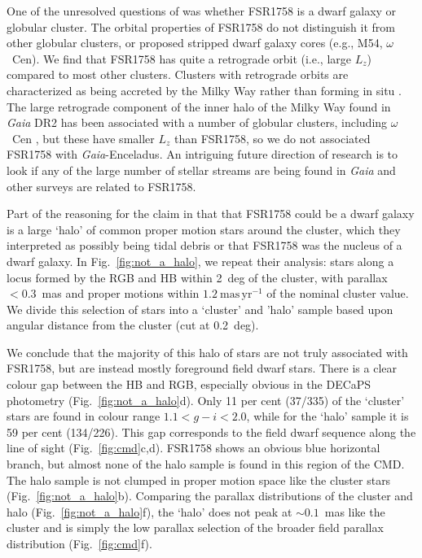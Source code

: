 \documentclass[fleqn,usenatbib,letters]{mnras}
\newcommand{\masyr}{~\ensuremath{\textrm{mas}\,\textrm{yr}^{-1}}}
\begin{document}
One of the unresolved questions of  was whether FSR1758 is a dwarf galaxy or globular cluster. The orbital properties of FSR1758 do not distinguish it from other globular clusters, or proposed stripped dwarf galaxy cores (e.g., M54, $\omega$~Cen). We find that FSR1758 has quite a retrograde orbit (i.e., large $L_z$) compared to most other clusters. Clusters with retrograde orbits are characterized as being accreted by the Milky Way rather than forming in situ \citep[e.g.,][]{Kruijssen2018}. The large retrograde component of the inner halo of the Milky Way found in \textit{Gaia} DR2 has been associated with a number of globular clusters, including $\omega$~Cen \citep{Helmi:2018wy}, but these have smaller $L_z$ than FSR1758, so we do not associated FSR1758 with \textit{Gaia}-Enceladus. An intriguing future direction of research is to look if any of the large number of stellar streams are being found in \textit{Gaia} and other surveys \citep[e.g.,][]{Shipp2018,Ibata:2018wn,Malhan:2018ko,Ibata2019} are related to FSR1758.

Part of the reasoning for the claim in  that that FSR1758 could be a dwarf galaxy is a large `halo' of common proper motion stars around the cluster, which they interpreted as possibly being tidal debris or that FSR1758 was the nucleus of a dwarf galaxy. In Fig.\ \ref{fig:not_a_halo}, we repeat their analysis: stars along a locus formed by the RGB and HB within 2~deg of the cluster, with parallax $<0.3$~mas and proper motions within $1.2\masyr$ of the nominal cluster value. We divide this selection of stars into a `cluster' and 'halo' sample based upon angular distance from the cluster (cut at 0.2~deg).

We conclude that the majority of this halo of stars are not truly associated with FSR1758, but are instead mostly foreground field dwarf stars. There is a clear colour gap between the HB and RGB, especially obvious in the DECaPS photometry (Fig.\ \ref{fig:not_a_halo}d). Only 11 per cent (37/335) of the `cluster' stars are found in colour range $1.1<g-i<2.0$,  while for the `halo' sample it is 59 per cent (134/226). This gap corresponds to the field dwarf sequence along the line of sight (Fig.\ \ref{fig:cmd}c,d). FSR1758 shows an obvious blue horizontal branch, but almost none of the halo sample is found in this region of the CMD. The halo sample is not clumped in proper motion space like the cluster stars (Fig.\ \ref{fig:not_a_halo}b). Comparing the parallax distributions of the cluster and halo (Fig.\ \ref{fig:not_a_halo}f), the `halo' does not peak at $\sim0.1$~mas like the cluster and is simply the low parallax selection of the broader field parallax distribution (Fig.\ \ref{fig:cmd}f).
\end{document}
